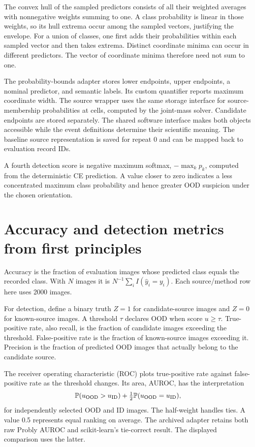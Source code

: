 \documentclass[11pt,a4paper]{report}
\newcommand{\Prob}{\mathbb P}
\begin{document}
The convex hull of the sampled predictors consists of all their weighted averages with nonnegative weights summing to one. A class probability is linear in those weights, so its hull extrema occur among the sampled vectors, justifying the envelope. For a union of classes, one first adds their probabilities within each sampled vector and then takes extrema. Distinct coordinate minima can occur in different predictors. The vector of coordinate minima therefore need not sum to one.

The probability-bounds adapter stores lower endpoints, upper endpoints, a nominal predictor, and semantic labels. Its custom quantifier reports maximum coordinate width. The source wrapper uses the same storage interface for source-membership probabilities at cells, computed by the joint-mass solver. Candidate endpoints are stored separately. The shared software interface makes both objects accessible while the event definitions determine their scientific meaning. The baseline source representation is saved for repeat 0 and can be mapped back to evaluation record IDs.

A fourth detection score is negative maximum softmax, $-\max_kp_k$, computed from the deterministic CE prediction. A value closer to zero indicates a less concentrated maximum class probability and hence greater OOD suspicion under the chosen orientation.

\section{Accuracy and detection metrics from first principles}
Accuracy is the fraction of evaluation images whose predicted class equals the recorded class. With $N$ images it is $N^{-1}\sum_iI(\widehat y_i=y_i)$. Each source/method row here uses 2000 images.

For detection, define a binary truth $Z=1$ for candidate-source images and $Z=0$ for known-source images. A threshold $\tau$ declares OOD when score $u\geq\tau$. True-positive rate, also recall, is the fraction of candidate images exceeding the threshold. False-positive rate is the fraction of known-source images exceeding it. Precision is the fraction of predicted OOD images that actually belong to the candidate source.

The receiver operating characteristic (ROC) plots true-positive rate against false-positive rate as the threshold changes. Its area, AUROC, has the interpretation
\begin{equation}
\Prob(u_{\rm OOD}>u_{\rm ID})+\tfrac12\Prob(u_{\rm OOD}=u_{\rm ID}),
\end{equation}
for independently selected OOD and ID images. The half-weight handles ties. A value 0.5 represents equal ranking on average. The archived adapter retains both raw Probly AUROC and scikit-learn's tie-correct result. The displayed comparison uses the latter.
\end{document}
